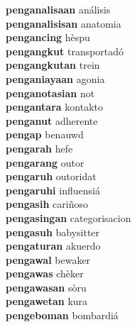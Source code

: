 \textbf{penganalisaan } análisis \\
\textbf{penganalisisan } anatomia \\
\textbf{pengancing } hèspu \\
\textbf{pengangkut } transportadó \\
\textbf{pengangkutan } trein \\
\textbf{penganiayaan } agonia \\
\textbf{penganotasian } not \\
\textbf{pengantara } kontakto \\
\textbf{penganut } adherente \\
\textbf{pengap } benauwd \\
\textbf{pengarah } hefe \\
\textbf{pengarang } outor \\
\textbf{pengaruh } outoridat \\
\textbf{pengaruhi } influensiá \\
\textbf{pengasih } cariñoso \\
\textbf{pengasingan } categorisacion \\
\textbf{pengasuh } babysitter \\
\textbf{pengaturan } akuerdo \\
\textbf{pengawal } bewaker \\
\textbf{pengawas } chèker \\
\textbf{pengawasan } sòru \\
\textbf{pengawetan } kura \\
\textbf{pengeboman } bombardiá \\
